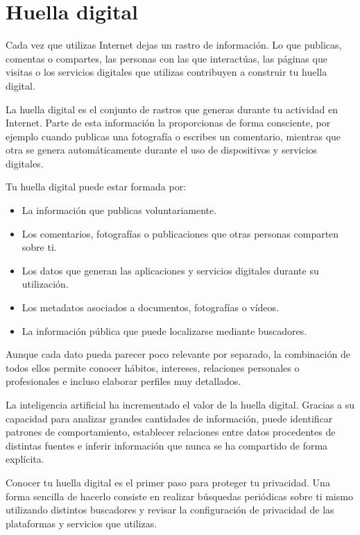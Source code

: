 \documentclass[
  spanish,
  a4paper,
  openany]{book}
\begin{document}
\section{Huella digital}\label{huella-digital}

Cada vez que utilizas Internet dejas un rastro de información. Lo que publicas, comentas o compartes, las personas con las que interactúas, las páginas que visitas o los servicios digitales que utilizas contribuyen a construir tu huella digital.

La huella digital es el conjunto de rastros que generas durante tu actividad en Internet. Parte de esta información la proporcionas de forma consciente, por ejemplo cuando publicas una fotografía o escribes un comentario, mientras que otra se genera automáticamente durante el uso de dispositivos y servicios digitales.

Tu huella digital puede estar formada por:

\begin{itemize}
\item
  La información que publicas voluntariamente.
\item
  Los comentarios, fotografías o publicaciones que otras personas comparten sobre ti.
\item
  Los datos que generan las aplicaciones y servicios digitales durante su utilización.
\item
  Los metadatos asociados a documentos, fotografías o vídeos.
\item
  La información pública que puede localizarse mediante buscadores.
\end{itemize}

Aunque cada dato pueda parecer poco relevante por separado, la combinación de todos ellos permite conocer hábitos, intereses, relaciones personales o profesionales e incluso elaborar perfiles muy detallados.

La inteligencia artificial ha incrementado el valor de la huella digital. Gracias a su capacidad para analizar grandes cantidades de información, puede identificar patrones de comportamiento, establecer relaciones entre datos procedentes de distintas fuentes e inferir información que nunca se ha compartido de forma explícita.

Conocer tu huella digital es el primer paso para proteger tu privacidad. Una forma sencilla de hacerlo consiste en realizar búsquedas periódicas sobre ti mismo utilizando distintos buscadores y revisar la configuración de privacidad de las plataformas y servicios que utilizas.
\end{document}
